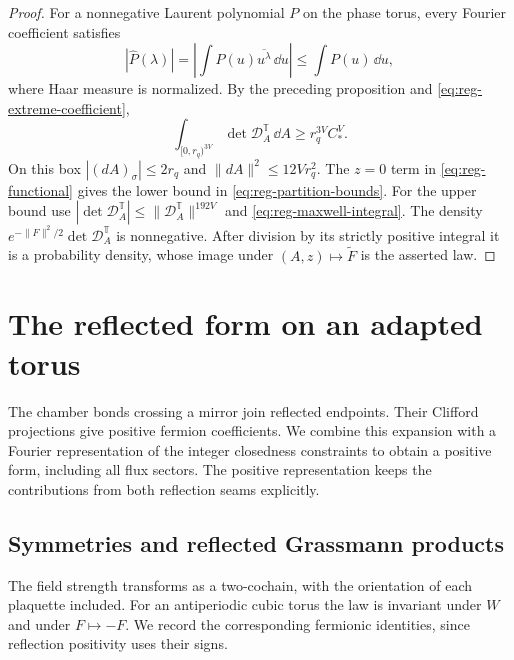 \begin{proof}
For a nonnegative Laurent polynomial $P$ on the phase torus, every
Fourier coefficient satisfies
\[
 |\widehat P(\lambda)|
 =\left|\int P(u)\overline{u^\lambda}\,\dd u\right|
 \le\int P(u)\,\dd u,
\]
where Haar measure is normalized. By the preceding proposition and
\eqref{eq:reg-extreme-coefficient},
\[
 \int_{[0,r_q)^{3V}}\det \mathcal D_A^{\mathbb T}\,\dd A
 \ge r_q^{3V}C_*^V.
\]
On this box $|(dA)_\sigma|\le2r_q$ and
$\|dA\|^2\le12Vr_q^2$. The $z=0$ term in
\eqref{eq:reg-functional} gives the lower bound in
\eqref{eq:reg-partition-bounds}. For the upper bound use
$|\det \mathcal D_A^{\mathbb T}|\le\|\mathcal D_A^{\mathbb T}\|^{192V}$ and
\eqref{eq:reg-maxwell-integral}. The density
$e^{-\|F\|^2/2}\det \mathcal D_A^{\mathbb T}$ is nonnegative. After division
by its strictly positive integral it is a probability density, whose
image under $(A,z)\mapsto\widetilde F$ is the asserted law.
\end{proof}

\section{The reflected form on an adapted torus}\label{sec:finite-reflection}

The chamber bonds crossing a mirror join reflected endpoints. Their
Clifford projections give positive fermion coefficients. We combine
this expansion with a Fourier representation of the integer closedness
constraints to obtain a positive form, including all flux sectors.
The positive representation keeps the contributions from both
reflection seams explicitly.

\subsection{Symmetries and reflected Grassmann products}
\label{subsec:reg-symmetries}

The field strength transforms as a two-cochain, with the orientation
of each plaquette included. For an antiperiodic cubic torus the law is invariant
under $W$ and under $F\mapsto-F$. We record the corresponding
fermionic identities, since reflection positivity uses their signs.

